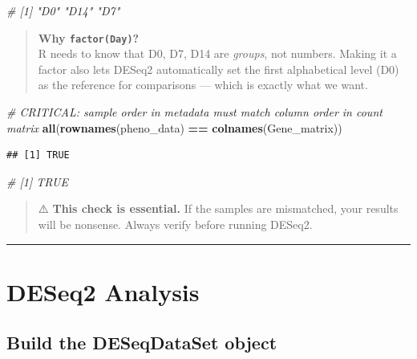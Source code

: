 \documentclass[
]{article}
\newenvironment{Shaded}{\begin{snugshade}}{\end{snugshade}}
\newcommand{\CommentTok}[1]{\textcolor[rgb]{0.56,0.35,0.01}{\textit{#1}}}
\newcommand{\FunctionTok}[1]{\textcolor[rgb]{0.13,0.29,0.53}{\textbf{#1}}}
\newcommand{\NormalTok}[1]{#1}
\newcommand{\SpecialCharTok}[1]{\textcolor[rgb]{0.81,0.36,0.00}{\textbf{#1}}}
\begin{document}
\begin{Shaded}
\begin{Highlighting}[]
\CommentTok{\# [1] "D0"  "D14" "D7"}
\end{Highlighting}
\end{Shaded}

\begin{quote}
\textbf{Why \texttt{factor(Day)}?}\\
R needs to know that D0, D7, D14 are \emph{groups}, not numbers. Making
it a factor also lets DESeq2 automatically set the first alphabetical
level (D0) as the reference for comparisons --- which is exactly what we
want.
\end{quote}

\begin{Shaded}
\begin{Highlighting}[]
\CommentTok{\# CRITICAL: sample order in metadata must match column order in count matrix}
\FunctionTok{all}\NormalTok{(}\FunctionTok{rownames}\NormalTok{(pheno\_data) }\SpecialCharTok{==} \FunctionTok{colnames}\NormalTok{(Gene\_matrix))}
\end{Highlighting}
\end{Shaded}

\begin{verbatim}
## [1] TRUE
\end{verbatim}

\begin{Shaded}
\begin{Highlighting}[]
\CommentTok{\# [1] TRUE}
\end{Highlighting}
\end{Shaded}

\begin{quote}
⚠️ \textbf{This check is essential.} If the samples are mismatched, your
results will be nonsense. Always verify before running DESeq2.
\end{quote}

\begin{center}\rule{0.5\linewidth}{0.5pt}\end{center}

\section{DESeq2 Analysis}\label{deseq2-analysis}

\subsection{Build the DESeqDataSet
object}\label{build-the-deseqdataset-object}
\end{document}
